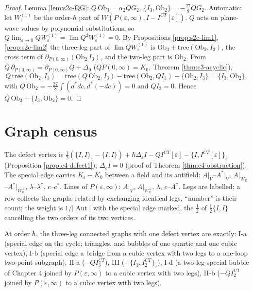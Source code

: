 \begin{proof}
Lemma \ref{lem:s2c-QG}: $Q\,\mathrm{Ob}_3=\alpha_2QG_2$, $\{I_3,\mathrm{Ob}_2\}=-\tfrac{27}8QG_2$. Automatic: let $W^{(1)}_\varepsilon$ be the order-$\hbar$ part of $W(P(\varepsilon,\infty),I-I^{CT}[\varepsilon])$. $Q$ acts on plane-wave values by polynomial substitutions, so $Q\lim_{\varepsilon\to0}QW^{(1)}_\varepsilon=\lim Q^2W^{(1)}_\varepsilon=0$. By Propositions \ref{prop:s2c-lim1}, \ref{prop:s2c-lim2} the three-leg part of $\lim QW^{(1)}_\varepsilon$ is $\mathrm{Ob}_3+\mathrm{tree}(\mathrm{Ob}_2,I_3)$, the cross term of $\partial_{P(0,\infty)}(\mathrm{Ob}_2\,I_3)$, and the two-leg part is $\mathrm{Ob}_2$. From $Q\,\partial_{P(0,\infty)}=\partial_{P(0,\infty)}Q+\Delta_0$ ($QP(0,\infty)=K_0$, Theorem \ref{thm:c3-acyclic}),
\[
Q\,\mathrm{tree}(\mathrm{Ob}_2,I_3)=\mathrm{tree}(Q\,\mathrm{Ob}_2,I_3)-\mathrm{tree}(\mathrm{Ob}_2,QI_3)+\{\mathrm{Ob}_2,I_3\}=\{I_3,\mathrm{Ob}_2\},
\]
with $Q\,\mathrm{Ob}_2=-\tfrac{27}8\int(d^*dc,d^*(-dc))=0$ and $QI_3=0$. Hence $Q\,\mathrm{Ob}_3+\{I_3,\mathrm{Ob}_2\}=0$.
\end{proof}

\section{Graph census}

The defect vertex is $\tfrac12(\{I,I\}_\varepsilon-\{I,I\})+\hbar\Delta_\varepsilon I-QI^{CT}[\varepsilon]-\{I,I^{CT}[\varepsilon]\}_\varepsilon$ (Proposition \ref{prop:c4-defect1}); $\Delta_\varepsilon I=0$ (proof of Theorem \ref{thm:c4-obstruction}). The special edge carries $K_\varepsilon-K_0$ between a field and its antifield: $A|_V$--$A^*|_V$, $A|_{W_{\mathbb R}^\perp}$--$A^*|_{W_{\mathbb R}^\perp}$, $\lambda$--$\lambda^*$, $c$--$c^*$. Lines of $P(\varepsilon,\infty)$: $A|_V$, $A|_{W_{\mathbb R}^\perp}$, $\lambda$, $c$--$A^*$. Legs are labelled; a row collects the graphs related by exchanging identical legs, ``number'' is their count; the weight is $1/|\operatorname{Aut}|$ with the special edge marked, the $\tfrac12$ of $\tfrac12\{I,I\}$ cancelling the two orders of its two vertices.

\begin{proposition}
\label{prop:s2c-classes}
At order $\hbar$, the three-leg connected graphs with one defect vertex are exactly: I-a (special edge on the cycle; triangles, and bubbles of one quartic and one cubic vertex), I-b (special edge a bridge from a cubic vertex with two legs to a one-loop two-point subgraph), II-a ($-QI^{CT}_3$), III ($-\{I_3,I^{CT}_2\}_\varepsilon$), I-d (a two-leg special bubble of Chapter 4 joined by $P(\varepsilon,\infty)$ to a cubic vertex with two legs), II-b ($-QI^{CT}_2$ joined by $P(\varepsilon,\infty)$ to a cubic vertex with two legs).
\end{proposition}

